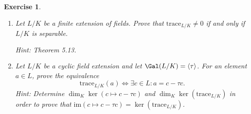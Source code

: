 \documentclass[a4paper,10pt,reqno]{amsart}
\newtheorem{ex}{Exercise}[section]
\begin{document}
\begin{ex}
\label{10.4}~
    \begin{enumerate}[label=(\roman*)]
        \item Let $L/K$ be a finite extension of fields. Prove that $\mathrm{trace}_{L/K} \neq 0$ if and only if $L/K$ is separable.

    \noindent \textit{Hint:} Theorem 5.13.
        \item Let $L/K$ be a cyclic field extension and let $\Gal(L/K) = \left\langle \tau \right\rangle$. For an element $a \in L$, prove the equivalence
        \[
        \mathrm{trace}_{L/K}(a) \Leftrightarrow \exists c \in L: a = c - \tau c.
        \]
        \noindent \textit{Hint:} Determine $\dim_K \ker (c \mapsto c- \tau c)$ and $\dim_K \ker (\mathrm{trace}_{L/K})$ in order to prove that $\mathrm{im}(c \mapsto c - \tau c) = \ker (\mathrm{trace}_{L/K})$.
    \end{enumerate}
\end{ex}
\end{document}
